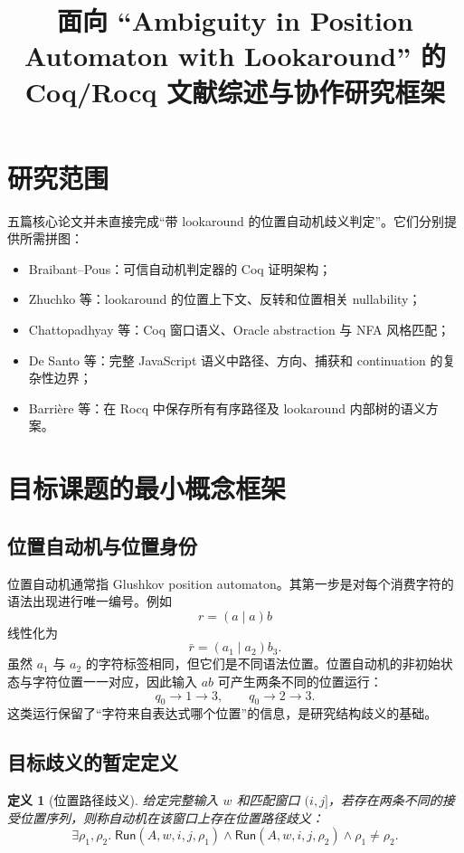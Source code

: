 \documentclass[UTF8,a4paper,12pt]{ctexart}
\title{\bfseries 面向 ``Ambiguity in Position Automaton with Lookaround'' 的\\
Coq/Rocq 文献综述与协作研究框架}
\author{}
\date{}
\newtheorem{definition}{定义}[section]
\newcommand{\Run}{\mathsf{Run}}
\begin{document}
\maketitle


\tableofcontents
\newpage

\section{研究范围}

五篇核心论文并未直接完成“带 lookaround 的位置自动机歧义判定”。它们分别提供所需拼图：

\begin{itemize}
  \item Braibant--Pous：可信自动机判定器的 Coq 证明架构；
  \item Zhuchko 等：lookaround 的位置上下文、反转和位置相关 nullability；
  \item Chattopadhyay 等：Coq 窗口语义、Oracle abstraction 与 NFA 风格匹配；
  \item De Santo 等：完整 JavaScript 语义中路径、方向、捕获和 continuation 的复杂性边界；
  \item Barri\`ere 等：在 Rocq 中保存所有有序路径及 lookaround 内部树的语义方案。
\end{itemize}

\section{目标课题的最小概念框架}

\subsection{位置自动机与位置身份}

位置自动机通常指 Glushkov position automaton。其第一步是对每个消费字符的语法出现进行唯一编号。例如
\[
r=(a\mid a)b
\]
线性化为
\[
\bar r=(a_1\mid a_2)b_3.
\]
虽然 $a_1$ 与 $a_2$ 的字符标签相同，但它们是不同语法位置。位置自动机的非初始状态与字符位置一一对应，因此输入 $ab$ 可产生两条不同的位置运行：
\[
q_0\to 1\to 3,
\qquad
q_0\to 2\to 3.
\]
这类运行保留了“字符来自表达式哪个位置”的信息，是研究结构歧义的基础。

\subsection{目标歧义的暂定定义}

\begin{definition}[位置路径歧义]
给定完整输入 $w$ 和匹配窗口 $(i,j]$，若存在两条不同的接受位置序列，则称自动机在该窗口上存在位置路径歧义：
\[
\exists \rho_1,\rho_2.\;
\Run(A,w,i,j,\rho_1)\land
\Run(A,w,i,j,\rho_2)\land
\rho_1\neq\rho_2.
\]
\end{definition}
\end{document}
